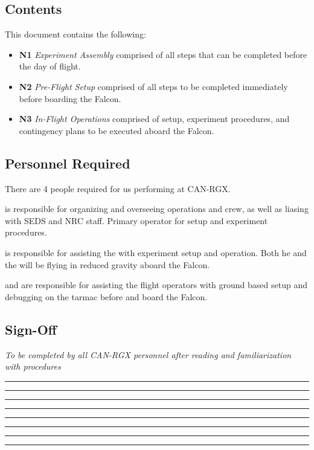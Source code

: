 \subsection{Contents}
This document contains the following:
\begin{itemize}
    \item \textbf{N1} \textit{Experiment Assembly} comprised of all steps that can be completed before the day of flight.
    \item \textbf{N2} \textit{Pre-Flight Setup} comprised of all steps to be completed immediately before boarding the Falcon.
    \item \textbf{N3} \textit{In-Flight Operations} comprised of setup, experiment procedures, and contingency plans to be executed aboard the Falcon.
\end{itemize}

\subsection{Personnel Required}
There are 4 people required for us performing at CAN-RGX.
\begin{checklist}
    \item \commanderfull{} is responsible for organizing and overseeing operations and crew, as well as liasing with SEDS and NRC staff. Primary operator for setup and experiment procedures.
    \item \payloadfull{} is responsible for assisting the \commander{} with experiment setup and operation. Both he and the \commander{} will be flying in reduced gravity aboard the Falcon.
    \item \mspecpri{} and \mspecsec{} are responsible for assisting the flight operators with ground based setup and debugging on the tarmac before \commander{} and \payload{} board the Falcon.
\end{checklist}
\setcounter{checklistnum}{0}

\subsection{Sign-Off}
\textit{To be completed by all CAN-RGX personnel after reading and familiarization with procedures}
\begin{checklist}
    \item \commanderfull      \tabto{25em}\rule{10em}{0.4pt}\hspace{5em}\rule{10em}{0.4pt}
    \item \payloadfull        \tabto{25em}\rule{10em}{0.4pt}\hspace{5em}\rule{10em}{0.4pt}
    \item \mspecprifull       \tabto{25em}\rule{10em}{0.4pt}\hspace{5em}\rule{10em}{0.4pt}
    \item \mspecsecfull       \tabto{25em}\rule{10em}{0.4pt}\hspace{5em}\rule{10em}{0.4pt}
\end{checklist}
\setcounter{checklistnum}{0}


